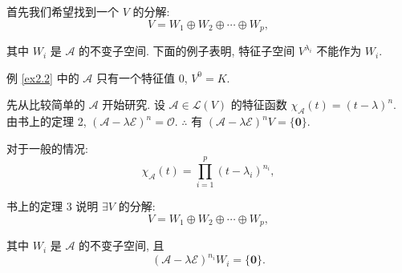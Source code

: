 \documentclass{ctexart}
\begin{document}
首先我们希望找到一个 $V$ 的分解:
\[V=W_1\oplus W_2\oplus\cdots\oplus W_p,\]

其中 $W_i$ 是 $\mathcal{A}$ 的不变子空间. 下面的例子表明, 特征子空间 $V^{\lambda_i}$ 不能作为 $W_i$.
\begin{example}
    例 \ref{ex2.2} 中的 $\mathcal{A}$ 只有一个特征值 $0$, $V^0=K$.
\end{example}

先从比较简单的 $\mathcal{A}$ 开始研究. 设 $\mathcal{A}\in\mathcal{L}(V)$ 的特征函数 $\chi_{\mathcal{A}}(t)=(t-\lambda)^n$. 由书上的定理 2, $(\mathcal{A}-\lambda\mathcal{E})^n=\mathcal{O}$. $\therefore$ 有 $(\mathcal{A}-\lambda\mathcal{E})^nV=\{\boldsymbol{0}\}$.

对于一般的情况:
\[\chi_{\mathcal{A}}(t)=\prod\limits_{i=1}^p(t-\lambda_i)^{n_i},\]

书上的定理 3 说明 $\exists V$ 的分解:
\[V=W_1\oplus W_2\oplus\cdots\oplus W_p,\]

其中 $W_i$ 是 $\mathcal{A}$ 的不变子空间, 且
\[(\mathcal{A}-\lambda\mathcal{E})^{n_i}W_i=\{\boldsymbol{0}\}.\]
\end{document}
